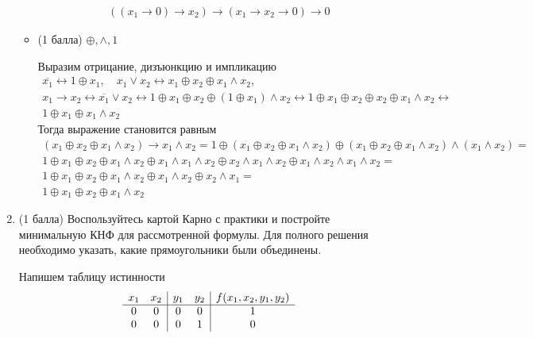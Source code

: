 \begin{enumerate}
\begin{itemize}
\begin{solution}
\begin{eqnarray}
        ((x_1 \rightarrow 0) \rightarrow x_2) \rightarrow (x_1 \rightarrow x_2 \rightarrow 0) \rightarrow 0
      \end{eqnarray}
    \end{solution}
    \item (1 балла) $\oplus, \land, 1$
    \begin{solution}
      Выразим отрицание, дизъюнкцию и импликацию
      \begin{eqnarray}
        \overline{x_1} \leftrightarrow 1 \oplus x_1, \quad x_1 \lor x_2 \leftrightarrow x_1 \oplus x_2 \oplus x_1 \land x_2, \\
        x_1 \rightarrow x_2 \leftrightarrow \overline{x_1} \lor x_2 \leftrightarrow 1 \oplus x_1 \oplus x_2 \oplus (1 \oplus x_1) \land x_2 \leftrightarrow 1 \oplus x_1 \oplus x_2 \oplus x_2 \oplus x_1 \land x_2 \leftrightarrow \\
        1 \oplus x_1 \oplus x_1 \land x_2
      \end{eqnarray}
      Тогда выражение становится равным
      \begin{eqnarray}
        (x_1 \oplus x_2 \oplus x_1 \land x_2) \rightarrow x_1 \land x_2 = 1 \oplus (x_1 \oplus x_2 \oplus x_1 \land x_2) \oplus (x_1 \oplus x_2 \oplus x_1 \land x_2) \land (x_1 \land x_2) = \\
        1 \oplus x_1 \oplus x_2 \oplus x_1 \land x_2 \oplus x_1 \land x_1 \land x_2 \oplus x_2 \land x_1 \land x_2 \oplus x_1 \land x_2 \land x_1 \land x_2 = \\
        1 \oplus x_1 \oplus x_2 \oplus x_1 \land x_2 \oplus x_1 \land x_2 \oplus x_2 \land x_1 = \\
        1 \oplus x_1 \oplus x_2 \oplus x_1 \land x_2
      \end{eqnarray}
    \end{solution}
  \end{itemize}
  \item (1 балла) Воспользуйтесь картой Карно с практики и постройте минимальную КНФ для рассмотренной формулы. Для полного решения необходимо указать, какие прямоугольники были объединены.
  \begin{solution}
    Напишем таблицу истинности
    \begin{displaymath}
      \begin{array}{c c|c c|c}
        x_1 & x_2 & y_1 & y_2 & f(x_1, x_2, y_1, y_2)\\
        \hline
        0 & 0 & 0 & 0 & 1\\
        0 & 0 & 0 & 1 & 0\\

\end{array}
\end{displaymath}
\end{solution}
\end{enumerate}
